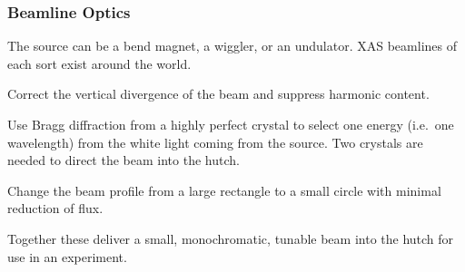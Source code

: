 \documentclass[10pt, xcolor=x11names, compress, handout]{beamer}
\begin{document}
\begin{frame}
  \frametitle{Beamline Optics}

  \begin{description}
  \item[Source] The source can be a bend magnet, a wiggler, or an
    undulator.  XAS beamlines of each sort exist around the world.
  \item[Collimating mirror] Correct the vertical divergence of the
    beam and suppress harmonic content.
  \item[Monochromator] Use Bragg diffraction from a highly perfect
    crystal to select one energy (i.e.\ one wavelength) from the white
    light coming from the source.  Two crystals are needed to direct
    the beam into the hutch.
  \item[Focussing mirror] Change the beam profile from a large
    rectangle to a small circle with minimal reduction of flux.
  \end{description}

  \begin{block}{}
    \begin{center}
      Together these deliver a small, monochromatic, tunable beam into
      the hutch for use in an experiment.
    \end{center}
  \end{block}
\end{frame}
\end{document}
